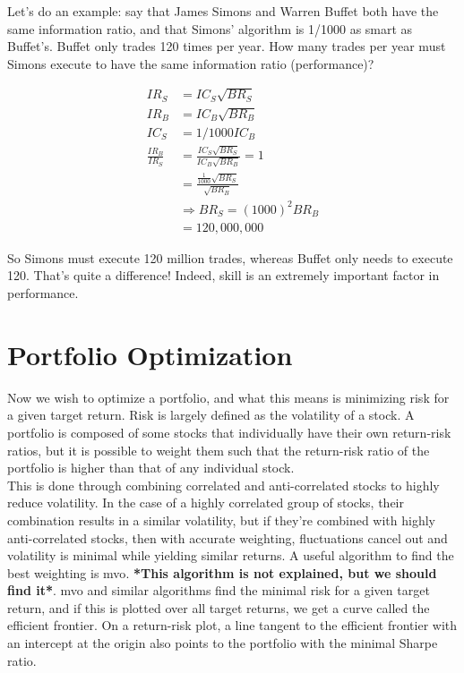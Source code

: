 \noindent Let's do an example: say that James Simons and Warren Buffet both have the same information ratio, and that Simons' algorithm is 1/1000 as smart as Buffet's. Buffet only trades 120 times per year. How many trades per year must Simons execute to have the same information ratio (performance)?

\begin{align*}
IR_S &= IC_S\sqrt{BR_S}\\
IR_B &= IC_B\sqrt{BR_B}\\
IC_S &= 1/1000IC_B\\
\frac{IR_B}{IR_S} &= \frac{IC_S\sqrt{BR_S}}{IC_B\sqrt{BR_B}} = 1\\
&= \frac{\frac{1}{1000}\sqrt{BR_S}}{\sqrt{BR_B}}\\
&\Rightarrow BR_S = (1000)^2BR_B\\
&= 120,000,000
\end{align*}

\noindent So Simons must execute 120 million trades, whereas Buffet only needs to execute 120. That's quite a difference! Indeed, skill is an extremely important factor in performance.

\section{Portfolio Optimization}
Now we wish to optimize a portfolio, and what this means is minimizing risk for a given target return. Risk is largely defined as the volatility of a stock. A portfolio is composed of some stocks that individually have their own return-risk ratios, but it is possible to weight them such that the return-risk ratio of the portfolio is higher than that of any individual stock. \\

This is done through combining correlated and anti-correlated stocks to highly reduce volatility. In the case of a highly correlated group of stocks, their combination results in a similar volatility, but if they're combined with highly anti-correlated stocks, then with accurate weighting, fluctuations cancel out and volatility is minimal while yielding similar returns. A useful algorithm to find the best weighting is \ac{mvo}. \textbf{*This algorithm is not explained, but we should find it*}. \ac{mvo} and similar algorithms find the minimal risk for a given target return, and if this is plotted over all target returns, we get a curve called the efficient frontier. On a return-risk plot, a line tangent to the efficient frontier with an intercept at the origin also points to the portfolio with the minimal Sharpe ratio.
